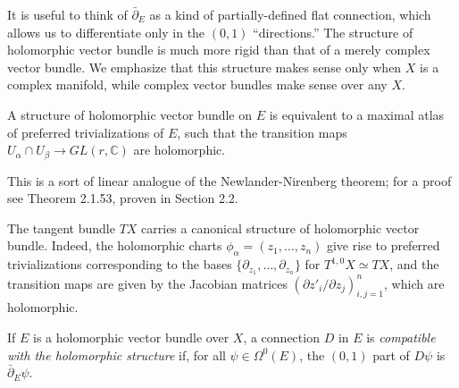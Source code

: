 \documentclass[12pt,letterpaper,reqno]{amsart}
\numberwithin{equation}{section}
\newcommand{\C}{\ensuremath{\mathbb C}}
\newcommand{\de}{\mathrm{d}}
\newcommand{\ti}[1]{\textit{#1}}
\begin{document}
It is useful to think of $\bar\partial_E$ as a kind of 
partially-defined flat connection, which allows us to differentiate
only in the $(0,1)$ ``directions.''
The structure of holomorphic vector bundle is much 
more rigid than that of a merely complex vector bundle.
We emphasize that this structure makes sense only when $X$ is 
a complex manifold, while complex vector bundles make sense 
over any $X$.

\begin{prop} A structure of holomorphic vector bundle on $E$ is equivalent to a maximal atlas 
of preferred trivializations of $E$, such that
the transition maps 
$U_\alpha \cap U_\beta \to GL(r,\C)$ 
are holomorphic. 
\end{prop}
\begin{pf}
This is a sort of linear analogue of the 
Newlander-Nirenberg theorem; for a proof see 
\cite{MR1079726} Theorem 2.1.53, proven in Section 2.2.
\end{pf}


\begin{example} The tangent bundle $TX$ carries
a canonical structure of holomorphic vector bundle.
Indeed, the holomorphic charts $\phi_\alpha = (z_1, \dots, z_n)$ 
give rise to preferred trivializations corresponding 
to the bases $\{\partial_{z_1}, \dots, \partial_{z_n} \}$
for $T^{1,0} X \simeq TX$, and the transition 
maps are given by the Jacobian matrices 
$(\partial z'_i / \partial z_j)_{i,j=1}^n$, which are holomorphic.
\end{example}

\begin{defn}
If $E$ is a holomorphic vector bundle over $X$,
a connection $D$ in $E$ is \ti{compatible with the
holomorphic structure} if, for all 
$\psi \in \Omega^0(E)$, the $(0,1)$ part of $D \psi$ 
is $\bar\partial_E \psi$.
\end{defn}
\end{document}
